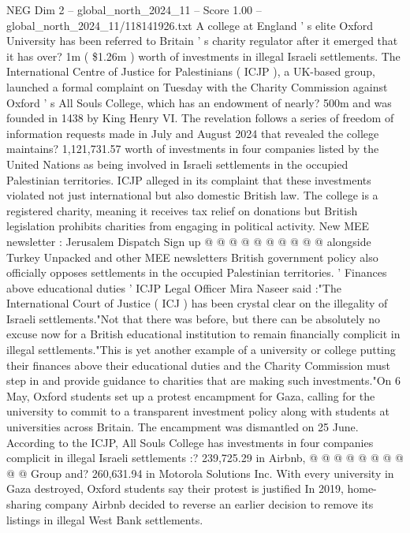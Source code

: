\begin{textsample}{NEG Dim 2 – global\_north\_2024\_11 – Score 1.00 – global\_north\_2024\_11/118141926.txt}  \label{ex:f2_neg_096}
A college at England ' s elite Oxford University has been referred to Britain ' s charity regulator after it emerged that it has over? 1m ( \$1.26m ) worth of investments in illegal Israeli settlements.
The International Centre of Justice for Palestinians ( ICJP ), a UK-based group, launched a formal complaint on Tuesday with the Charity Commission against Oxford ' s All Souls College, which has an endowment of nearly? 500m and was founded in 1438 by King Henry VI.
The revelation follows a series of freedom of information requests made in July and August 2024 that revealed the college maintains? 1,121,731.57 worth of investments in four companies listed by the United Nations as being involved in Israeli settlements in the occupied Palestinian territories.
ICJP alleged in its complaint that these investments violated not just international but also domestic British law.
The college is a registered charity, meaning it receives tax relief on donations but British legislation prohibits charities from engaging in political activity.
New MEE newsletter : Jerusalem Dispatch Sign up @ @ @ @ @ @ @ @ @ @ alongside Turkey Unpacked and other MEE newsletters British government policy also officially opposes settlements in the occupied Palestinian territories. ' Finances above educational duties ' ICJP Legal Officer Mira Naseer said :"The International Court of Justice ( ICJ ) has been crystal clear on the illegality of Israeli settlements."Not that there was before, but there can be absolutely no excuse now for a British educational institution to remain financially complicit in illegal settlements."This is yet another example of a university or college putting their finances above their educational duties and the Charity Commission must step in and provide guidance to charities that are making such investments."On 6 May, Oxford students set up a protest encampment for Gaza, calling for the university to commit to a transparent investment policy along with students at universities across Britain.
The encampment was dismantled on 25 June.
According to the ICJP, All Souls College has investments in four companies complicit in illegal Israeli settlements :? 239,725.29 in Airbnb, @ @ @ @ @ @ @ @ @ @ Group and? 260,631.94 in Motorola Solutions Inc.
With every university in Gaza destroyed, Oxford students say their protest is justified In 2019, home-sharing company Airbnb decided to reverse an earlier decision to remove its listings in illegal West Bank settlements.

\end{textsample}
